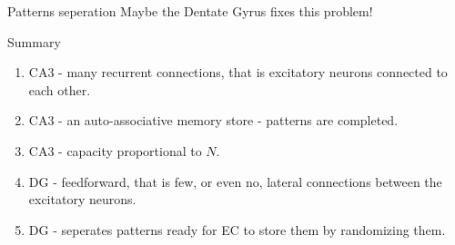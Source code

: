 \documentclass{beamer}
\begin{document}
\begin{frame}{Patterns seperation}
  Maybe the Dentate Gyrus fixes this problem!
\end{frame}

\begin{frame}{Summary}
\begin{enumerate}
\item CA3 - many recurrent connections, that is excitatory neurons connected to each other.
\item CA3 - an auto-associative memory store - patterns are completed.
\item CA3 - capacity proportional to \color{reddish}$N$\color{black}.
\item DG - feedforward, that is few, or even no, lateral connections between the excitatory neurons.
\item DG - seperates patterns ready for EC to store them by randomizing them.
\end{enumerate}
\end{frame}
\end{document}
